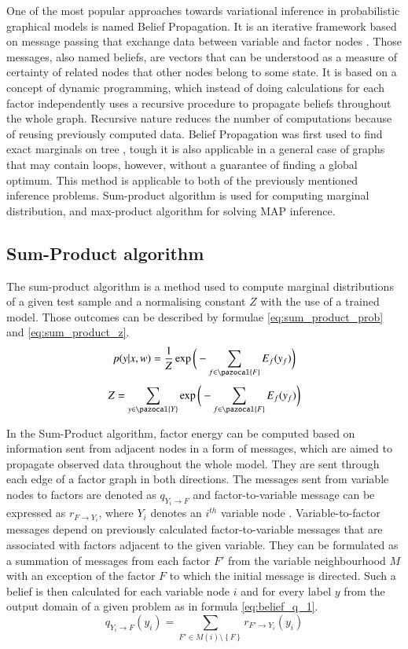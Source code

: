 One of the most popular approaches towards variational inference in probabilistic graphical models is named Belief Propagation. It is an iterative framework based on message passing that exchange data between variable and factor nodes \cite{markov_blake}. Those messages, also named beliefs, are vectors that can be understood as a measure of certainty of related nodes that other nodes belong to some state. It is based on a concept of dynamic programming, which instead of doing calculations for each factor independently uses a recursive procedure to propagate beliefs throughout the whole graph. Recursive nature reduces the number of computations because of reusing previously computed data. Belief Propagation was first used to find exact marginals on tree \cite{bayes_pearl}, tough it is also applicable in a general case of graphs that may contain loops, however, without a guarantee of finding a global optimum. This method is applicable to both of the previously mentioned inference problems. Sum-product algorithm is used for computing marginal distribution, and max-product algorithm for solving MAP inference. 

\subsection{Sum-Product algorithm}
The sum-product algorithm is a method used to compute marginal distributions of a given test sample and a normalising constant $Z$ with the use of a trained model. Those outcomes can be described by formulae \ref{eq:sum_product_prob} and \ref{eq:sum_product_z}.
\begin{equation}
    \label{eq:sum_product_prob}
    p(y|x,w)=\frac{1}{Z}\exp{\bigg(-\sum_{f \in \pazocal{F}}{E_f(y_f)}\bigg)} 
\end{equation}
\begin{equation}
    \label{eq:sum_product_z}
     Z=\sum_{y \in \pazocal{Y}}{\exp{\bigg(-\sum_{f \in \pazocal{F}}{E_f(y_f)}\bigg)}} 
\end{equation}

In the Sum-Product algorithm, factor energy can be computed based on information sent from adjacent nodes in a form of messages, which are aimed to propagate observed data throughout the whole model. They are sent through each edge of a factor graph in both directions. The messages sent from variable nodes to factors are denoted as $q_{Y_i\rightarrow F}$ and factor-to-variable message can be expressed as $r_{F\rightarrow Y_i}$, where $Y_i$ denotes an $i^{th}$ variable node \cite{Nowozin}. Variable-to-factor messages depend on previously calculated factor-to-variable messages that are associated with factors adjacent to the given variable. They can be formulated as a summation of messages from each factor $F'$ from the variable neighbourhood $M$ with an exception of the factor $F$ to which the initial message is directed. Such a belief is then calculated for each variable node $i$ and for every label $y$ from the output domain of a given problem as in formula \ref{eq:belief_q_1}.
\begin{equation}
    \label{eq:belief_q_1}
    q_{Y_i\rightarrow F}(y_i)=\sum_{F' \in M(i) \setminus \left \{ F \right \} }{ r_{F'\rightarrow Y_i}(y_i)}
\end{equation}

